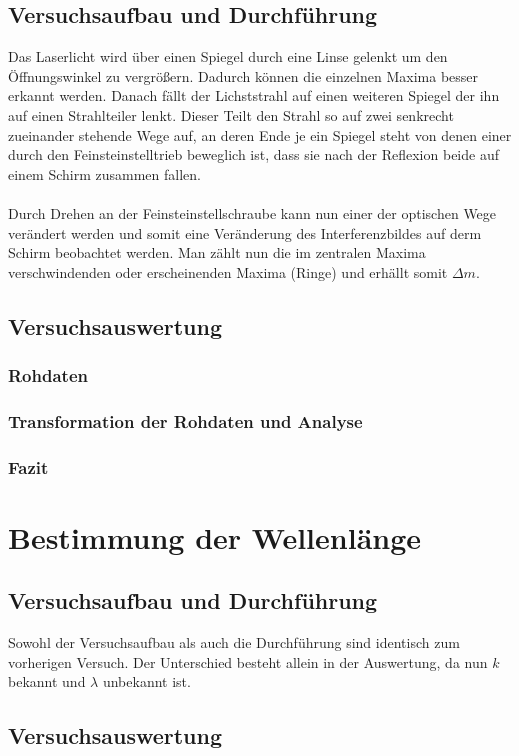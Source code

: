 \documentclass[12pt,a4paper]{article}
\begin{document}
\subsection{Versuchsaufbau und Durchführung}
Das Laserlicht wird über einen Spiegel durch eine Linse gelenkt um den Öffnungswinkel zu vergrößern. Dadurch können die einzelnen Maxima besser erkannt werden. Danach fällt der Lichststrahl auf einen weiteren Spiegel der ihn auf einen Strahlteiler lenkt. Dieser Teilt den Strahl so auf zwei senkrecht zueinander stehende Wege auf, an deren Ende je ein Spiegel steht von denen einer durch den Feinsteinstelltrieb beweglich ist, dass sie nach der Reflexion beide auf einem Schirm zusammen fallen.\\\\
Durch Drehen an der Feinsteinstellschraube kann nun einer der optischen Wege verändert werden und somit eine Veränderung des Interferenzbildes auf derm Schirm beobachtet werden. Man zählt nun die im zentralen Maxima verschwindenden oder erscheinenden Maxima (Ringe) und erhällt somit $\Delta m$.
\subsection{Versuchsauswertung}
\subsubsection{Rohdaten}
\subsubsection{Transformation der Rohdaten und Analyse}
\subsubsection{Fazit}
\section{Bestimmung der Wellenlänge}
\subsection{Versuchsaufbau und Durchführung}
Sowohl der Versuchsaufbau als auch die Durchführung sind identisch zum vorherigen Versuch. Der Unterschied besteht allein in der Auswertung, da nun $k$ bekannt und $\lambda$ unbekannt ist.
\subsection{Versuchsauswertung}
\end{document}
